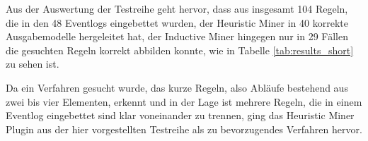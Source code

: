 Aus der Auswertung der Testreihe geht hervor, dass aus insgesamt 104 Regeln, die in den 48 Eventlogs eingebettet wurden, der Heuristic Miner in 40 korrekte Ausgabemodelle hergeleitet hat, der Inductive Miner hingegen nur in 29 Fällen die gesuchten Regeln korrekt abbilden konnte, wie in Tabelle \ref{tab:results_short} zu sehen ist.
\begin{table}[!htbp]
\centering
{}
\caption{Ergebnisse der Auswertung der Versuchsreihe}
\label{tab:results_short}
\end{table}

Da ein Verfahren gesucht wurde, das kurze Regeln, also Abläufe bestehend aus zwei bis vier Elementen, erkennt und in der Lage ist mehrere Regeln, die in einem Eventlog eingebettet sind klar voneinander zu trennen, ging das Heuristic Miner Plugin aus der hier vorgestellten Testreihe als zu bevorzugendes Verfahren hervor.

